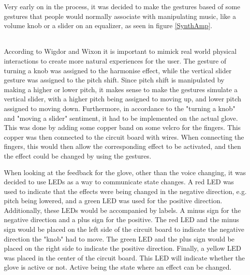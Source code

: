 Very early on in the process, it was decided to make the gestures based of some gestures that people would normally associate with manipulating music, like a volume knob or a slider on an equalizer, as seen in figure \ref{SynthAmp}.\\

\begin{minipage}{\linewidth}%
\label{SynthAmp}
\end{minipage}\\

According to Wigdor and Wixon it is important to mimick real world physical interactions to create more natural experiences for the user\citep[pp. 47]{Wigdor_2011}. 
The gesture of turning a knob was assigned to the harmonise effect, while the vertical slider gesture was assigned to the pitch shift. Since pitch shift is manipulated by making a higher or lower pitch, it makes sense to make the gestures simulate a vertical slider, with a higher pitch being assigned to moving up, and lower pitch assigned to moving down.
Furthermore, in accordance to the "turning a knob" and "moving a slider" sentiment, it had to be implemented on the actual glove. This was done by adding some copper band on some velcro for the fingers. This copper was then connected to the circuit board with wires. When connecting the fingers, this would then allow the corresponding effect to be activated, and then the effect could be changed by using the gestures.

When looking at the feedback for the glove, other than the voice changing, it was decided to use LEDs as a way to communicate state changes. A red LED was used to indicate that the effects were being changed in the negative direction, e.g. pitch being lowered, and a green LED was used for the positive direction. Additionally, these LEDs would be accompanied by labels. A minus sign for the negative direction and a plus sign for the positive. The red LED and the minus sign would be placed on the left side of the circuit board to indicate the negative direction the "knob" had to move. The green LED and the plus sign would be placed on the right side to indicate the positive direction.
Finally, a yellow LED was placed in the center of the circuit board. This LED will indicate whether the glove is active or not. Active being the state where an effect can be changed.


